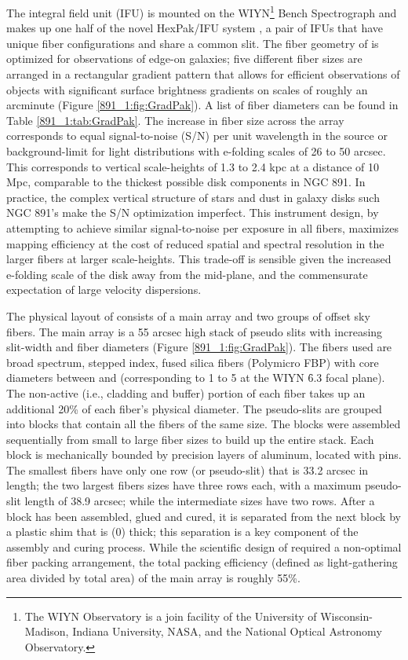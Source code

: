 The \GP integral field unit (IFU) is mounted on the WIYN\footnote{The
  WIYN Observatory is a join facility of the University of
  Wisconsin-Madison, Indiana University, NASA, and the National
  Optical Astronomy Observatory.}  Bench Spectrograph
\citep{Barden94,Bershady08,Knezek10} and makes up one half of the
novel HexPak/\GP IFU system \citep{Wood12}, a pair of IFUs that have
unique fiber configurations and share a common slit. The fiber
geometry of \GP is optimized for observations of edge-on galaxies;
five different fiber sizes are arranged in a rectangular gradient
pattern that allows for efficient observations of objects with
significant surface brightness gradients on scales of roughly an
arcminute (Figure \ref{891_1:fig:GradPak}).  A list of fiber diameters can
be found in Table \ref{891_1:tab:GradPak}. The increase in fiber size across
the array corresponds to equal signal-to-noise (S/N) per unit
wavelength in the source or background-limit for light distributions
with e-folding scales of 26 to 50 arcsec. This corresponds to vertical
scale-heights of 1.3 to 2.4 kpc at a distance of 10 Mpc, comparable to
the thickest possible disk components in NGC 891.  In practice, the
complex vertical structure of stars and dust in galaxy disks such NGC
891's make the S/N optimization imperfect. This instrument design, by
attempting to achieve similar signal-to-noise per exposure in all
fibers, maximizes mapping efficiency at the cost of reduced spatial
and spectral resolution in the larger fibers at larger
scale-heights. This trade-off is sensible given the increased
e-folding scale of the disk away from the mid-plane, and the
commensurate expectation of large velocity dispersions.

The physical layout of \GP consists of a main array and two groups of
offset sky fibers. The main array is a 55 arcsec high stack of pseudo
slits with increasing slit-width and fiber diameters (Figure
\ref{891_1:fig:GradPak}). The fibers used are broad spectrum, stepped index,
fused silica fibers (Polymicro FBP) with core diameters between
 and  (corresponding to 1
to 5 at the WIYN \f6.3 focal plane). The non-active
(i.e., cladding and buffer) portion of each fiber takes up an
additional 20\% of each fiber's physical diameter. The pseudo-slits
are grouped into blocks that contain all the fibers of the same
size. The blocks were assembled sequentially from small to large fiber
sizes to build up the entire stack. Each block is mechanically bounded
by precision layers of aluminum, located with pins. The smallest
fibers have only one row (or pseudo-slit) that is 33.2 arcsec in
length; the two largest fibers sizes have three rows each, with a
maximum pseudo-slit length of 38.9 arcsec; while the intermediate
sizes have two rows. After a block has been assembled, glued and
cured, it is separated from the next block by a plastic shim that is
 (0) thick; this separation is a key
component of the assembly and curing process.  While the scientific
design of \GP required a non-optimal fiber packing arrangement, the
total packing efficiency (defined as light-gathering area divided by
total area) of the main array is roughly 55\%.

